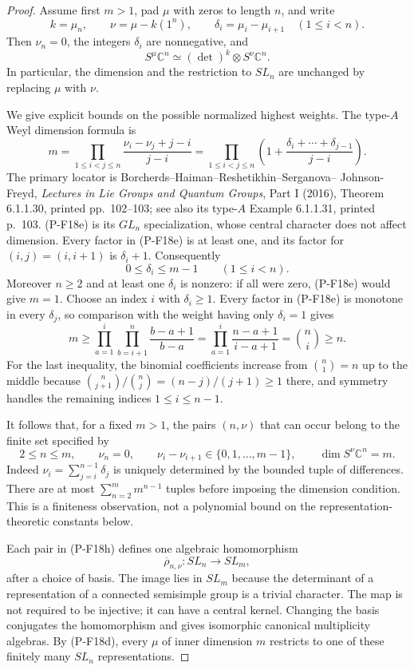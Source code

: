 \documentclass[11pt,a4paper]{article}
\begin{document}
\begin{proof}
Assume first $m>1$, pad $\mu$ with zeros to length $n$, and write
\[
 k=\mu_n,\qquad \nu=\mu-k(1^n),\qquad
 \delta_i=\mu_i-\mu_{i+1}\quad(1\le i<n).
\]
Then $\nu_n=0$, the integers $\delta_i$ are nonnegative, and
\[
 S^\mu\mathbb C^n\simeq
 (\det)^k\otimes S^\nu\mathbb C^n.
 \tag{P-F18d}
\]
In particular, the dimension and the restriction to $SL_n$ are
unchanged by replacing $\mu$ with $\nu$.

We give explicit bounds on the possible normalized highest weights.
The type-$A$ Weyl dimension formula is
\[
 m=\prod_{1\le i<j\le n}
       \frac{\nu_i-\nu_j+j-i}{j-i}
   =\prod_{1\le i<j\le n}
       \left(1+\frac{\delta_i+\cdots+\delta_{j-1}}{j-i}\right).
 \tag{P-F18e}
\]
The primary locator is Borcherds--Haiman--Reshetikhin--Serganova--
Johnson-Freyd, \emph{Lectures in Lie Groups and Quantum Groups},
Part I (2016), Theorem 6.1.1.30, printed pp.~102--103;
see also its type-$A$ Example 6.1.1.31, printed p.~103.
(P-F18e) is its $GL_n$ specialization, whose central character
does not affect dimension. Every factor in (P-F18e) is at least
one, and its factor for $(i,j)=(i,i+1)$ is $\delta_i+1$.
Consequently
\[
 0\le\delta_i\le m-1\qquad(1\le i<n).
 \tag{P-F18f}
\]
Moreover $n\ge2$ and at least one $\delta_i$ is nonzero: if all
were zero, (P-F18e) would give $m=1$.
Choose an index $i$ with $\delta_i\ge1$. Every factor in (P-F18e)
is monotone in every $\delta_j$, so comparison with the weight
having only $\delta_i=1$ gives
\[
 m\ge\prod_{a=1}^{i}\prod_{b=i+1}^{n}
                  \frac{b-a+1}{b-a}
   =\prod_{a=1}^{i}\frac{n-a+1}{i-a+1}
   =\binom ni\ge n.
 \tag{P-F18g}
\]
For the last inequality, the binomial coefficients increase from
$\binom n1=n$ up to the middle because
$\binom n{j+1}/\binom nj=(n-j)/(j+1)\ge1$ there, and symmetry
handles the remaining indices $1\le i\le n-1$.

It follows that, for a fixed $m>1$, the pairs $(n,\nu)$ that can
occur belong to the finite set specified by
\[
 2\le n\le m,\qquad \nu_n=0,\qquad
 \nu_i-\nu_{i+1}\in\{0,1,\ldots,m-1\},\qquad
 \dim S^\nu\mathbb C^n=m.
 \tag{P-F18h}
\]
Indeed $\nu_i=\sum_{j=i}^{n-1}\delta_j$ is uniquely determined
by the bounded tuple of differences. There are at most
$\sum_{n=2}^{m}m^{n-1}$ tuples before imposing the dimension
condition. This is a finiteness observation, not a polynomial bound
on the representation-theoretic constants below.

Each pair in (P-F18h) defines one algebraic homomorphism
\[
 \overline\rho_{n,\nu}:SL_n\longrightarrow SL_m,
 \tag{P-F18i}
\]
after a choice of basis. The image lies in $SL_m$ because the
determinant of a representation of a connected semisimple group is
a trivial character. The map is not required to be injective;
it can have a central kernel. Changing the basis conjugates the
homomorphism and gives isomorphic canonical multiplicity algebras.
By (P-F18d), every $\mu$ of inner dimension $m$ restricts to one
of these finitely many $SL_n$ representations.


\end{proof}
\end{document}

